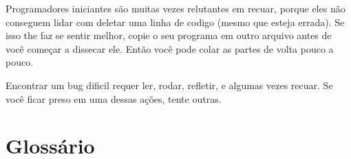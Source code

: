 Programadores iniciantes são muitas vezes relutantes em recuar, porque
eles não conseguem lidar com deletar uma linha de codigo (mesmo que
esteja errada). Se isso the faz se sentir melhor, copie o seu programa
em outro arquivo antes de você começar a dissecar ele. Então você pode
colar as partes de volta pouco a pouco.

Encontrar um bug dificil requer ler, rodar, refletir, e algumas vezes
recuar. Se você ficar preso em uma dessas ações, tente outras.


\section{Glossário}

